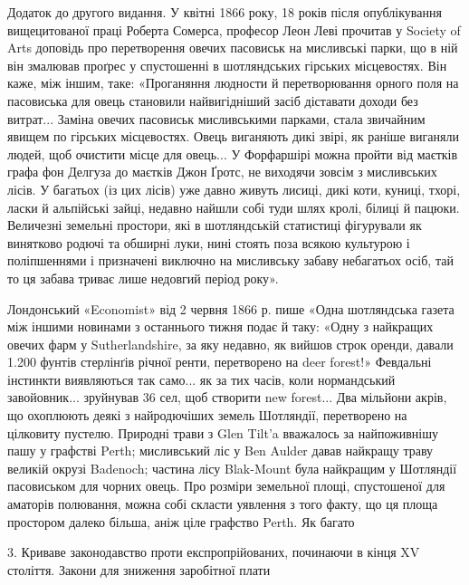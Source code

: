 Додаток до другого видання. У квітні 1866 року, 18 років після
опублікування вищецитованої праці Роберта Сомерса, професор Леон
Леві прочитав у Society of Arts доповідь про перетворення овечих пасовиськ
на мисливські парки, що в ній він змалював проґрес у спустошенні
в шотляндських гірських місцевостях. Він каже, між іншим, таке: «Проганяння
людности й перетворювання орного поля на пасовиська для
овець становили найвигідніший засіб діставати доходи без витрат... Заміна
овечих пасовиськ мисливськими парками, стала звичайним явищем
по гірських місцевостях. Овець виганяють дикі звірі, як раніше виганяли
людей, щоб очистити місце для овець... У Форфаршірі можна пройти
від маєтків графа фон Делгуза до маєтків Джон Ґротс, не виходячи
зовсім з мисливських лісів. У багатьох (із цих лісів) уже давно живуть
лисиці, дикі коти, куниці, тхорі, ласки й альпійські зайці, недавно
найшли собі туди шлях кролі, білиці й пацюки. Величезні земельні простори,
які в шотляндській статистиці фігурували як винятково родючі
та обширні луки, нині стоять поза всякою культурою і поліпшеннями і
призначені виключно на мисливську забаву небагатьох осіб, тай то ця
забава триває лише недовгий період року».

Лондонський «Economist» від 2 червня 1866 р. пише «Одна шотляндська
газета між іншими новинами з останнього тижня подає й таку:
«Одну з найкращих овечих фарм у Sutherlandshire, за яку недавно, як
вийшов строк оренди, давали 1.200 фунтів стерлінґів річної ренти, перетворено
на deer forest!» Февдальні інстинкти виявляються так само...
як за тих часів, коли нормандський завойовник... зруйнував 36 сел, щоб
створити new forest... Два мільйони акрів, що охоплюють деякі з найродючіших
земель Шотляндії, перетворено на цілковиту пустелю. Природні
трави з Glen Tilt’a вважалось за найпоживнішу пашу у графстві Perth;
мисливський ліс у Ben Aulder давав найкращу траву великій окрузі
Badenoch; частина лісу Blak-Mount була найкращим у Шотляндії пасовиськом
для чорних овець. Про розміри земельної площі, спустошеної
для аматорів полювання, можна собі скласти уявлення з того факту, що
ця площа простором далеко більша, аніж ціле графство Perth. Як багато

3. Криваве законодавство проти експропрійованих, починаючи
в кінця XV століття. Закони для зниження заробітної плати

